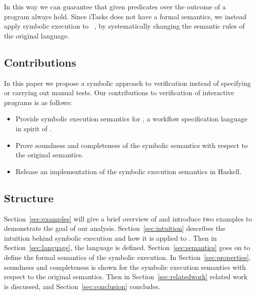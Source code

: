 In this way we can guarantee that given predicates over the outcome of a \TOP program always hold.
Since iTasks does not have a formal semantics, we instead apply symbolic execution to \TOPHAT~\cite{Steenvoorden2019}, by systematically changing the semantic rules of the original language.



\subsection{Contributions}

In this paper we propose a symbolic approach to verification instead of specifying or carrying out manual tests.
Our contributions to verification of interactive programs is as follows:

\begin{itemize}
  \item Provide symbolic execution semantics for \TOPHAT, a workflow specification language in spirit of \TOP.
  \item Prove soundness and completeness of the symbolic semantics with respect to the original \TOPHAT semantics.
  \item Release an implementation of the symbolic execution semantics in Haskell.
\end{itemize}



\subsection{Structure}

Section~\ref{sec:examples} will give a brief overview of \TOPHAT and introduce two examples to demonstrate the goal of our analysis.
Section~\ref{sec:intuition} describes the intuition behind symbolic execution and how it is applied to \TOPHAT.
Then in Section~\ref{sec:language}, the \TOPHAT language is defined.
Section~\ref{sec:semantics} goes on to define the formal semantics of the symbolic execution.
In Section~\ref{sec:properties}, soundness and completeness is shown for the symbolic execution semantics with respect to the original \TOPHAT semantics.
Then in Section~\ref{sec:relatedwork} related work is discussed, and Section~\ref{sec:conclusion} concludes.
